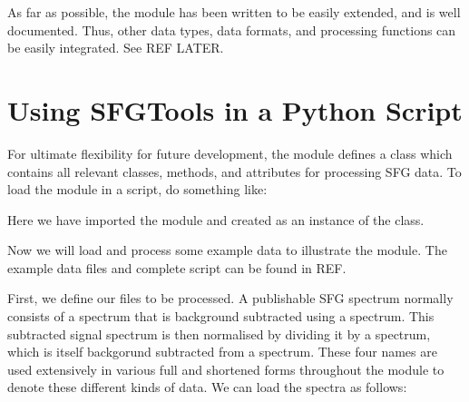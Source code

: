 \documentclass[a4paper,10pt,english]{sphinxmanual}
\begin{document}
\sphinxAtStartPar
As far as possible, the module has been written to be easily extended, and is well documented. Thus, other data types, data formats, and processing functions can be easily integrated. See REF LATER.

\section{Using SFGTools in a Python Script}
\label{\detokenize{index:using-sfgtools-in-a-python-script}}
\sphinxAtStartPar
For ultimate flexibility for future development, the  module defines a class  which contains all relevant classes, methods, and attributes for processing SFG data. To load the module in a script, do something like:

\begin{sphinxVerbatim}[commandchars=\\\{\}]
   
  
\end{sphinxVerbatim}

\sphinxAtStartPar
Here we have imported the module and created  as an instance of the  class.

\sphinxAtStartPar
Now we will load and process some example data to illustrate the module. The example data files and complete script can be found in REF.

\sphinxAtStartPar
First, we define our files to be processed. A publishable SFG spectrum normally consists of a  spectrum that is background subtracted using a  spectrum. This subtracted signal spectrum is then normalised by dividing it by a  spectrum, which is itself backgorund subtracted from a  spectrum. These four names are used extensively in various full and shortened forms throughout the module to denote these different kinds of data. We can load the spectra as follows:

\begin{sphinxVerbatim}[commandchars=\\\{\}]
  
  \PYG{p}{[}\PYG{p}{]}
  \PYG{p}{[}\PYG{p}{]}
  \PYG{p}{[}\PYG{p}{]}
  \PYG{p}{[}\PYG{p}{]}
\end{sphinxVerbatim}
\end{document}
